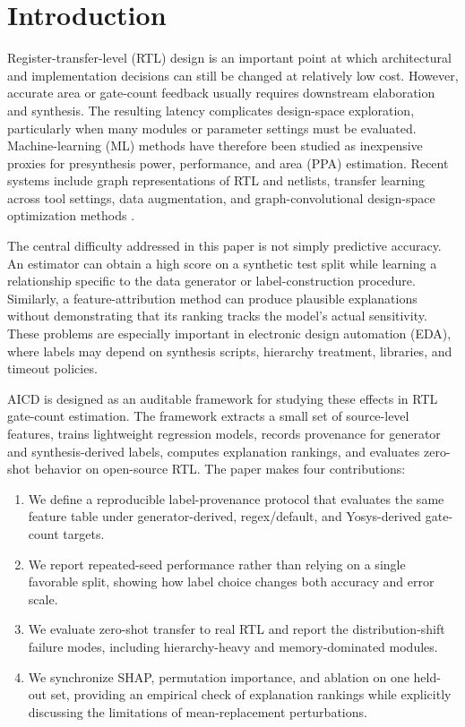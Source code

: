 \documentclass[conference]{IEEEtran}
\begin{document}
\section{Introduction}

Register-transfer-level (RTL) design is an important point at which architectural and implementation decisions can still be changed at relatively low cost. However, accurate area or gate-count feedback usually requires downstream elaboration and synthesis. The resulting latency complicates design-space exploration, particularly when many modules or parameter settings must be evaluated. Machine-learning (ML) methods have therefore been studied as inexpensive proxies for presynthesis power, performance, and area (PPA) estimation. Recent systems include graph representations of RTL and netlists, transfer learning across tool settings, data augmentation, and graph-convolutional design-space optimization methods \cite{fang2023masterrtl,fang2025transfer,francisco2021ppa,levy2024fastpase}.

The central difficulty addressed in this paper is not simply predictive accuracy. An estimator can obtain a high score on a synthetic test split while learning a relationship specific to the data generator or label-construction procedure. Similarly, a feature-attribution method can produce plausible explanations without demonstrating that its ranking tracks the model's actual sensitivity. These problems are especially important in electronic design automation (EDA), where labels may depend on synthesis scripts, hierarchy treatment, libraries, and timeout policies.

AICD is designed as an auditable framework for studying these effects in RTL gate-count estimation. The framework extracts a small set of source-level features, trains lightweight regression models, records provenance for generator and synthesis-derived labels, computes explanation rankings, and evaluates zero-shot behavior on open-source RTL. The paper makes four contributions:
\begin{enumerate}
\item We define a reproducible label-provenance protocol that evaluates the same feature table under generator-derived, regex/default, and Yosys-derived gate-count targets.
\item We report repeated-seed performance rather than relying on a single favorable split, showing how label choice changes both accuracy and error scale.
\item We evaluate zero-shot transfer to real RTL and report the distribution-shift failure modes, including hierarchy-heavy and memory-dominated modules.
\item We synchronize SHAP, permutation importance, and ablation on one held-out set, providing an empirical check of explanation rankings while explicitly discussing the limitations of mean-replacement perturbations.
\end{enumerate}
\end{document}
